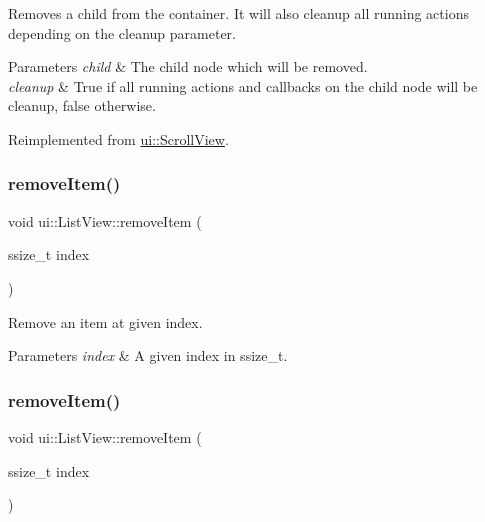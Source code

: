 Removes a child from the container. It will also cleanup all running actions depending on the cleanup parameter.


\begin{DoxyParams}{Parameters}
{\em child} & The child node which will be removed. \\
\hline
{\em cleanup} & True if all running actions and callbacks on the child node will be cleanup, false otherwise. \\
\hline
\end{DoxyParams}


Reimplemented from \hyperlink{classui_1_1ScrollView_a678108e716966e8beccc25c0de1d9b29}{ui\+::\+Scroll\+View}.

\mbox{\label{classui_1_1ListView_a71d47608a35c7e6b7c4d986916998baa}} 
\subsubsection{\texorpdfstring{remove\+Item()}{removeItem()}\hspace{0.1cm}{\footnotesize\ttfamily [1/2]}}
{\footnotesize\ttfamily void ui\+::\+List\+View\+::remove\+Item (\begin{DoxyParamCaption}\item[{ssize\+\_\+t}]{index }\end{DoxyParamCaption})}

Remove an item at given index.


\begin{DoxyParams}{Parameters}
{\em index} & A given index in ssize\+\_\+t. \\
\hline
\end{DoxyParams}
\mbox{\label{classui_1_1ListView_a71d47608a35c7e6b7c4d986916998baa}} 
\subsubsection{\texorpdfstring{remove\+Item()}{removeItem()}\hspace{0.1cm}{\footnotesize\ttfamily [2/2]}}
{\footnotesize\ttfamily void ui\+::\+List\+View\+::remove\+Item (\begin{DoxyParamCaption}\item[{ssize\+\_\+t}]{index }\end{DoxyParamCaption})}


